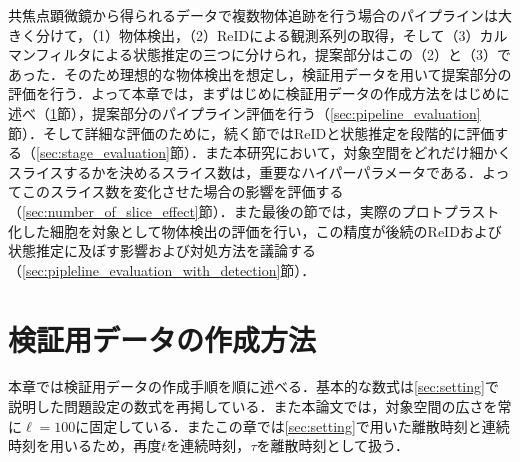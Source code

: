 \thispagestyle{fancy2}

共焦点顕微鏡から得られるデータで複数物体追跡を行う場合のパイプラインは大きく分けて，（1）物体検出，（2）ReIDによる観測系列の取得，そして（3）カルマンフィルタによる状態推定の三つに分けられ，提案部分はこの（2）と（3）であった．そのため理想的な物体検出を想定し，検証用データを用いて提案部分の評価を行う．よって本章では，まずはじめに検証用データの作成方法をはじめに述べ（\ref{sec:demodata}節），提案部分のパイプライン評価を行う（\ref{sec:pipeline_evaluation}節）．そして詳細な評価のために，続く節ではReIDと状態推定を段階的に評価する（\ref{sec:stage_evaluation}節）．また本研究において，対象空間をどれだけ細かくスライスするかを決めるスライス数は，重要なハイパーパラメータである．よってこのスライス数を変化させた場合の影響を評価する（\ref{sec:number_of_slice_effect}節）．また最後の節では，実際のプロトプラスト化した細胞を対象として物体検出の評価を行い，この精度が後続のReIDおよび状態推定に及ぼす影響および対処方法を議論する（\ref{sec:pipleline_evaluation_with_detection}節）．

\section{検証用データの作成方法}
\label{sec:demodata}

本章では検証用データの作成手順を順に述べる．基本的な数式は\ref{sec:setting}で説明した問題設定の数式を再掲している．また本論文では，対象空間の広さを常に$\ell = 100$に固定している．またこの章では\ref{sec:setting}で用いた離散時刻と連続時刻を用いるため，再度$t$を連続時刻，$\tau$を離散時刻として扱う．

